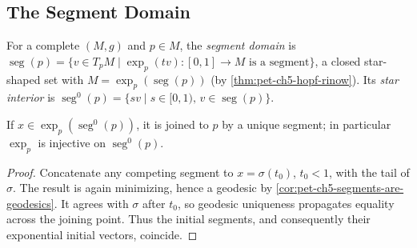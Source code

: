 \subsection{The Segment Domain}

\begin{definition}
  \label{def:pet-ch5-segment-domain}
  \leanok
  For a complete $(M,g)$ and $p\in M$, the \emph{segment domain} is
  $\operatorname{seg}(p)=\{v\in T_pM\mid\exp_p(tv):[0,1]\to M\text{ is a segment}\}$,
  a closed star-shaped set with $M=\exp_p(\operatorname{seg}(p))$ (by
  \cref{thm:pet-ch5-hopf-rinow}). Its \emph{star interior} is
  $\operatorname{seg}^0(p)=\{sv\mid s\in[0,1),\,v\in\operatorname{seg}(p)\}$.
\end{definition}

\begin{proposition}
  \label{prop:pet-ch5-segment-domain-injective}
  \leanok
  If $x\in\exp_p(\operatorname{seg}^0(p))$, it is joined to $p$ by a unique
  segment; in particular $\exp_p$ is injective on $\operatorname{seg}^0(p)$.
\end{proposition}
\begin{proof}
  \leanok
  \sketch
  Concatenate any competing segment to $x=\sigma(t_0)$, $t_0<1$, with the tail of
  $\sigma$.  The result is again minimizing, hence a geodesic by
  \cref{cor:pet-ch5-segments-are-geodesics}.  It agrees with $\sigma$ after $t_0$,
  so geodesic uniqueness propagates equality across the joining point.  Thus the
  initial segments, and consequently their exponential initial vectors, coincide.
\end{proof}

